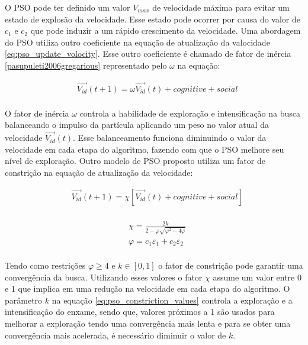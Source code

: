 O PSO pode ter definido um valor $V_{max}$ de velocidade máxima para evitar um estado de explosão da velocidade. Esse estado pode ocorrer por causa do valor de $c_1$ e $c_2$ que pode induzir a um rápido crescimento da velocidade. Uma abordagem do PSO utiliza outro coeficiente na equação de atualização da valocidade \ref{eq:pso_update_volocity}. Esse outro coeficiente é chamado de fator de inércia \ref{pasupuleti2006gregarious} representado pelo $\omega$ na equação:

\begin{equation}
\label{eq:pso_update_volocity_inertia}
\begin{split}
& \vec{V_{id}}(t + 1) = \omega \vec{V_{id}}(t) + cognitive + social \\
\end{split}
\end{equation}

O fator de inércia $\omega$ controla a habilidade de exploração e intensificação na busca balanceando o impulso da partícula aplicando um peso no valor atual da velocidade $\vec{V_{id}}(t)$. Esse balanceamento funciona diminuindo o valor da velocidade em cada etapa do algoritmo, fazendo com que o PSO melhore seu nível de exploração. Outro modelo de PSO proposto utiliza um fator de constrição na equação de atualização da velocidade:

\begin{equation}
\label{eq:pso_update_volocity_constriction}
\begin{split}
& \vec{V_{id}}(t + 1) = \chi [\vec{V_{id}}(t) + cognitive + social] \\
\end{split}
\end{equation}

\begin{equation}
\label{eq:pso_constriction_values}
\begin{split}
& \chi = \frac{2 k}{2 - \varphi \sqrt{\varphi^{2} -4 \varphi}} \\
& \varphi = c_1 \varepsilon_1 + c_2 \varepsilon_2 \\
\end{split}
\end{equation}

Tendo como restrições $\varphi \geq 4$ e $k \in [0,1]$ o fator de constrição pode garantir uma convergência da busca. Utilizando esses valores o fator $\chi$ assume um valor entre 0 e 1 que implica em uma redução na velocidade em cada etapa do algoritmo. O parâmetro $k$ na equação \ref{eq:pso_constriction_values} controla a exploração e a intensificação do enxame, sendo que, valores próximos a 1 são usados para melhorar a exploração tendo uma convergência mais lenta e para se obter uma convergência mais acelerada, é necessário diminuir o valor de $k$.

